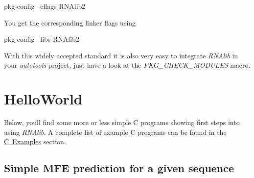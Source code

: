 \begin{DoxyVerb}pkg-config --cflags RNAlib2
\end{DoxyVerb}


You get the corresponding linker flags using

\begin{DoxyVerb}pkg-config --libs RNAlib2
\end{DoxyVerb}


With this widely accepted standard it is also very easy to integrate {\itshape R\+N\+Alib} in your {\itshape autotools} project, just have a look at the {\itshape P\+K\+G\+\_\+\+C\+H\+E\+C\+K\+\_\+\+M\+O\+D\+U\+L\+ES} macro.

 \hypertarget{helloworld}{}\section{Hello\+World}\label{helloworld}
Below, you\textquotesingle{}ll find some more or less simple C programs showing first steps into using {\itshape R\+N\+Alib}. A complete list of example C programs can be found in the \mbox{\hyperlink{examples_c}{C Examples}} section.

\subsection*{Simple M\+FE prediction for a given sequence }


